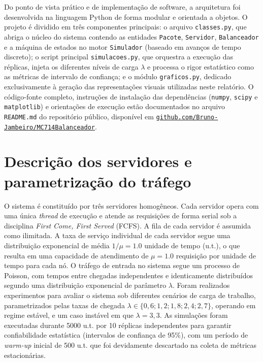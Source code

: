 \documentclass[conference]{IEEE_Conference_Template/IEEEtran}
\begin{document}
Do ponto de vista prático e de implementação de software, a arquitetura foi desenvolvida na linguagem Python de forma modular e orientada a objetos. O projeto é dividido em três componentes principais: o arquivo \texttt{classes.py}, que abriga o núcleo do sistema contendo as entidades \texttt{Pacote}, \texttt{Servidor}, \texttt{Balanceador} e a máquina de estados no motor \texttt{Simulador} (baseado em avanços de tempo discreto); o script principal \texttt{simulacoes.py}, que orquestra a execução das réplicas, injeta os diferentes níveis de carga $\lambda$ e processa o rigor estatístico como as métricas de intervalo de confiança; e o módulo \texttt{graficos.py}, dedicado exclusivamente à geração das representações visuais utilizadas neste relatório. O código-fonte completo, instruções de instalação das dependências (\texttt{numpy}, \texttt{scipy} e \texttt{matplotlib}) e orientações de execução estão documentados no arquivo \texttt{README.md} do repositório público, disponível em \href{https://github.com/Bruno-Jambeiro/MC714Balanceador}{\texttt{github.com/Bruno-Jambeiro/MC714Balanceador}}.

\section{Descrição dos servidores e parametrização do tráfego}
O sistema é constituído por três servidores homogêneos. Cada servidor opera com uma única \textit{thread} de execução e atende as requisições de forma serial sob a disciplina \textit{First Come, First Served} (FCFS). A fila de cada servidor é assumida como ilimitada. A taxa de serviço individual de cada servidor segue uma distribuição exponencial de média $1/\mu = 1.0$ unidade de tempo (u.t.), o que resulta em uma capacidade de atendimento de $\mu = 1.0$ requisição por unidade de tempo para cada nó. 
O tráfego de entrada no sistema segue um processo de Poisson, com tempos entre chegadas independentes e identicamente distribuídos segundo uma distribuição exponencial de parâmetro $\lambda$. Foram realizados experimentos para avaliar o sistema sob diferentes cenários de carga de trabalho, parametrizados pelas taxas de chegada $\lambda \in \{0,6; 1,2; 1,8; 2,4; 2,7\}$, operando em regime estável, e um caso instável em que $\lambda = 3,3$. As simulações foram executadas durante 5000 u.t. por 10 réplicas independentes para garantir confiabilidade estatística (intervalos de confiança de 95\%), com um período de \textit{warm-up} inicial de 500 u.t. que foi devidamente descartado na coleta de métricas estacionárias.
\end{document}
